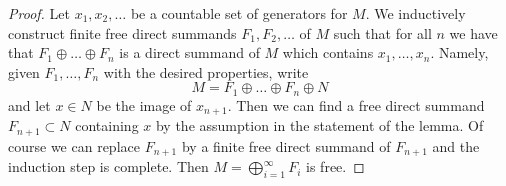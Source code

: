 \documentclass[10pt,a4paper]{amsart}
\theoremstyle{plain}
\theoremstyle{definition}
\theoremstyle{remark}
\numberwithin{equation}{subsection}
\begin{document}
\begin{proof}
Let $x_1, x_2, \ldots$ be a countable set of generators for $M$.
We inductively construct finite free direct summands
$F_1, F_2, \ldots$ of $M$ such that for all $n$ we have
that $F_1 \oplus \ldots \oplus F_n$ is a direct summand of $M$
which contains $x_1, \ldots, x_n$. Namely, given $F_1, \ldots, F_n$
with the desired properties, write
$$
M = F_1 \oplus \ldots \oplus F_n \oplus N
$$
and let $x \in N$ be the image of $x_{n + 1}$.
Then we can find a free direct summand $F_{n + 1} \subset N$
containing $x$ by the assumption in the statement of the lemma.
Of course we can replace $F_{n + 1}$ by a finite free direct
summand of $F_{n + 1}$ and the induction step is complete.
Then $M = \bigoplus_{i = 1}^{\infty} F_i$ is free.
\end{proof}
\end{document}

